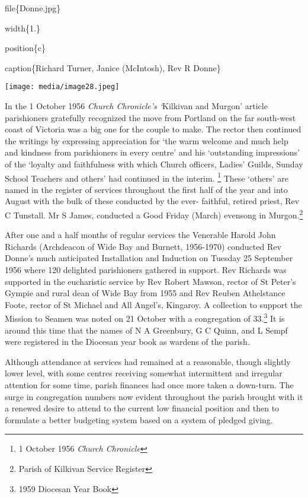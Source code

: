 file\{Donne.jpg\}

width\{1.\}

position\{c\}

caption\{Richard Turner, Janice (McIntosh), Rev R Donne\}

\texttt{[image: media/image28.jpeg]}

In the 1 October 1956 \emph{Church Chronicle's `}Kilkivan and Murgon' article parishioners gratefully recognized the move from Portland on the far south-west coast of Victoria was a big one for the couple to make. The rector then continued the writings by expressing appreciation for `the warm welcome and much help and kindness from parishioners in every centre' and his `outstanding impressions' of the `loyalty and faithfulness with which Church officers, Ladies' Guilds, Sunday School Teachers and others' had continued in the interim. \footnote{1 October 1956 \emph{Church Chronicle}} These `others' are named in the register of services throughout the first half of the year and into August with the bulk of these conducted by the ever- faithful, retired priest, Rev C Tunstall. Mr S James, conducted a Good Friday (March) evensong in Murgon.\footnote{Parish of Kilkivan Service Register}

After one and a half months of regular services the Venerable Harold John Richards (Archdeacon of Wide Bay and Burnett, 1956-1970) conducted Rev Donne's much anticipated Installation and Induction on Tuesday 25 September 1956 where 120 delighted parishioners gathered in support. Rev Richards was supported in the eucharistic service by Rev Robert Mawson, rector of St Peter's Gympie and rural dean of Wide Bay from 1955 and Rev Reuben Athelstance Foote, rector of St Michael and All Angel's, Kingaroy. A collection to support the Mission to Seamen was noted on 21 October with a congregation of 33.\footnote{1959 Diocesan Year Book} It is around this time that the names of N A Greenbury, G C Quinn, and L Sempf were registered in the Diocesan year book as wardens of the parish.

Although attendance at services had remained at a reasonable, though slightly lower level, with some centres receiving somewhat intermittent and irregular attention for some time, parish finances had once more taken a down-turn. The surge in congregation numbers now evident throughout the parish brought with it a renewed desire to attend to the current low financial position and then to formulate a better budgeting system based on a system of pledged giving.

